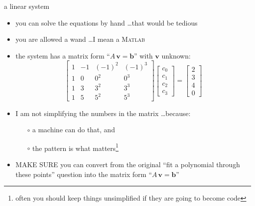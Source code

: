 \documentclass[10pt,hyperref]{beamer}
\newcommand{\bb}{\mathbf{b}}
\newcommand{\bv}{\mathbf{v}}
\newcommand{\Matlab}{\textsc{Matlab}\xspace}
\newcommand{\MO}{\Matlab}
\newcommand{\MS}{\alert{MAKE SURE}\xspace}
\begin{document}
\begin{frame}{a linear system}
\begin{itemize}
\item you can solve the equations by hand \dots that would be tedious
\item you are allowed a wand \dots I mean a \MO
\item the system has a matrix form ``$A\, \bv = \bb$'' with $\bv$ unknown:
$$\begin{bmatrix}
1 & -1 & (-1)^2 & (-1)^3 \\
1 & 0 & 0^2 & 0^3 \\
1 & 3 & 3^2 & 3^3 \\
1 & 5 & 5^2 & 5^3
\end{bmatrix}\begin{bmatrix}
c_0 \\ c_1 \\ c_2 \\ c_3
\end{bmatrix}
=
\begin{bmatrix}
2 \\ 3 \\ 4 \\ 0
\end{bmatrix}$$
\item I am not simplifying the numbers in the matrix \dots because:
  \begin{itemize}
  \item[$\circ$] a machine can do that, and 
  \item[$\circ$] the pattern is what matters\footnote{often you should keep things unsimplified if they are going to become code}
  \end{itemize}
\item \MS you can convert from the original ``fit a polynomial through these points'' question into the matrix form ``$A\, \bv = \bb$''
\end{itemize}
\end{frame}
\end{document}
